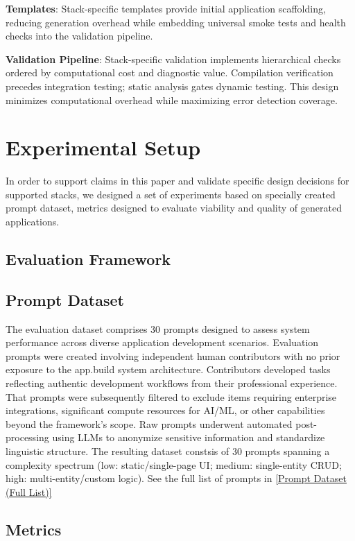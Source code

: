 \documentclass{article}
\begin{document}
\textbf{Templates}: Stack-specific templates provide initial application scaffolding, reducing generation overhead while embedding universal smoke tests and health checks into the validation pipeline.

\textbf{Validation Pipeline}: Stack-specific validation implements hierarchical checks ordered by computational cost and diagnostic value. Compilation verification precedes integration testing; static analysis gates dynamic testing. This design minimizes computational overhead while maximizing error detection coverage.

\section{Experimental Setup}

In order to support claims in this paper and validate specific design decisions for supported stacks, we designed a set of experiments based on specially created prompt dataset, metrics designed to evaluate viability and quality of generated applications.

\subsection{Evaluation Framework}

\subsection{Prompt Dataset}

The evaluation dataset comprises 30 prompts designed to assess system performance across diverse application development scenarios. Evaluation prompts were created involving independent human contributors with no prior exposure to the app.build system architecture. Contributors developed tasks reflecting authentic development workflows from their professional experience. That prompts were subsequently filtered to exclude items requiring enterprise integrations, significant compute resources for AI/ML, or other capabilities beyond the framework's scope. Raw prompts underwent automated post-processing using LLMs to anonymize sensitive information and standardize linguistic structure.
The resulting dataset constsis of 30 prompts spanning a complexity spectrum (low: static/single-page UI; medium: single-entity CRUD; high: multi-entity/custom logic).
See the full list of prompts in \ref{Prompt Dataset (Full List)}

\subsection{Metrics}
\end{document}
